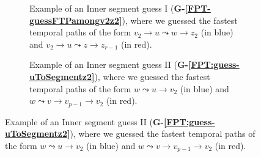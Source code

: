 \documentclass[a4paper,UKenglish,cleveref, autoref, thm-restate]{lipics-v2021}
\begin{document}
\begin{figure}[t]
	\centering
	\begin{subfigure}[b]{0.48\textwidth}
		\centering
		\caption{Example of an Inner segment guess I (\textcolor{lipicsGray}{\textsf{\textbf{G-\ref{FPT-guessFTPamongv2z2}}}}), where we guessed the fastest temporal paths of the form $v_2 \rightarrow u \leadsto w \rightarrow z_2$ (in blue)
			and $v_2 \rightarrow u \leadsto z \rightarrow z_{r-1}$ (in red).
			\label{fig:FPT-guessG4}}
	\end{subfigure}
	\quad
	\begin{subfigure}[b]{0.48\textwidth}
		\centering
		\caption{Example of an Inner segment guess II (\textcolor{lipicsGray}{\textsf{\textbf{G-\ref{FPT:guess-uToSegmentz2}}}}), where we guessed the fastest temporal paths of the form $w \leadsto u \rightarrow v_2$ (in blue) and $w \leadsto v \rightarrow  v_{p-1} \rightarrow v_2$ (in red). 
			\label{fig:FPT-guessG5}}
	\end{subfigure}
	

\end{figure}
\end{document}
